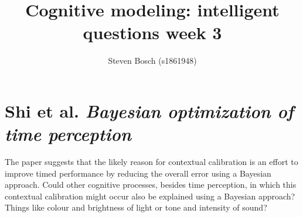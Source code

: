 \documentclass{article}
\title{Cognitive modeling: intelligent questions week 3}
\author{Steven Bosch (s1861948)}
\begin{document}
	
\maketitle
\section{Shi et al. \textit{Bayesian optimization of time perception}}
The paper suggests that the likely reason for contextual calibration is an effort to improve timed performance by reducing the overall error using a Bayesian approach. Could other cognitive processes, besides time perception, in which this contextual calibration might occur also be explained using a Bayesian approach? Things like colour and brightness of light or tone and intensity of sound?
\end{document}
